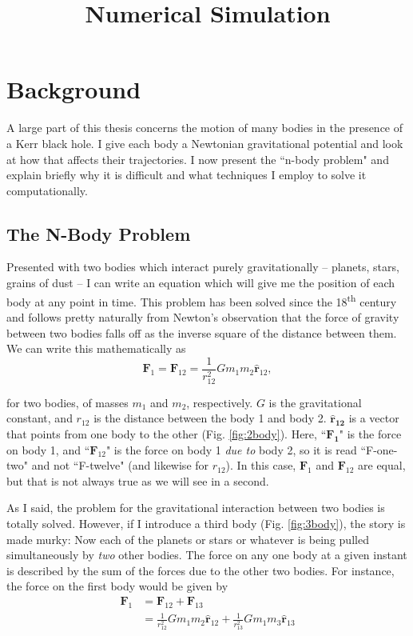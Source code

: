 \documentclass[11pt]{article}
\title{Numerical Simulation}
\date{}                                           %
\begin{document}
\maketitle
\section{Background}
A large part of this thesis concerns the motion of many bodies in the presence of a Kerr black hole.  I give each body a Newtonian gravitational potential and look at how that affects their trajectories.  I now present the ``n-body problem" and explain briefly why it is difficult and what techniques I employ to solve it computationally.
\subsection{The N-Body Problem}\label{sec:nbody-intro}
Presented with two bodies which interact purely gravitationally \--- planets, stars, grains of dust \--- I can write an equation which will give me the position of each body at any point in time.  This problem has been solved since the 18\textsuperscript{th} century and follows pretty naturally from Newton's observation that the force of gravity between two bodies falls off as the inverse square of the distance between them.  We can write this mathematically as
\begin{equation*}
\mathbf{F}_1 = \mathbf{F}_{12} = \frac{1}{r_{12}^2}G m_1 m_2\mathbf{\hat{r}}_{12},
\end{equation*}

 for two bodies, of masses $m_1$ and $m_2$, respectively.  $G$ is the gravitational constant, and $r_{12}$ is the distance between the body 1 and body 2.   $\mathbf{\hat{r}_{12}}$ is a vector that points from one body to the other (Fig. \ref{fig:2body}).  Here, ``$\mathbf{F_1}$" is the force on body 1, and ``$\mathbf{F}_{12}$" is the force on body 1 \emph{due to} body 2, so it is read ``F-one-two" and not ``F-twelve" (and likewise for $r_{12}$).  In this case, $\mathbf{F}_1$ and $\mathbf{F}_{12}$ are equal, but that is not always true as we will see in a second. 


As I said, the problem for the gravitational interaction between two bodies is totally solved.  However, if I introduce a third body (Fig. \ref{fig:3body}), the story is made murky:  Now each of the planets or stars or whatever is being pulled simultaneously by \emph{two} other bodies.  The force on any one body at a given instant is described by the sum of the forces due to the other two bodies.  For instance, the force on the first body would be given by
\begin{align*}
\mathbf{F}_1 &= \mathbf{F}_{12}+\mathbf{F}_{13}\\
&= \frac{1}{r_{12}^2}G m_1 m_2 \mathbf{\hat{r}}_{12} +  \frac{1}{r_{13}^2}G m_1 m_3 \mathbf{\hat{r}}_{13}
\end{align*}
\end{document}
